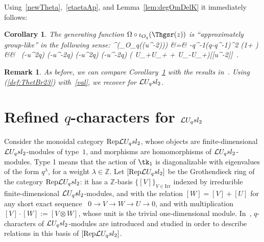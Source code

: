 \documentclass[11pt]{amsart}
\numberwithin{equation}{section}
\newtheorem{cor}[thm]{Corollary}
\newtheorem{rem}[thm]{Remark}
\numberwithin{equation}{section}
\begin{document}
Using~\eqref{newTheta},~\eqref{etaetaAp}, and Lemma~\ref{lem:degOmDelK} it immediately follows:
\begin{cor}\label{cor:DelTh} The generating function $\Omega \circ \iota_{O_q}(\Thgsr(z))$ is ``approximately group-like'' in the following sense: 
	\beqa
	\Delta^\Omega	\left(\Omega \circ\iota_{O_q}\left(\Thgsr(u^{-2})\right)\right) &=& -q^{-1}(q-q^{-1})^{2}   \left(1+  \right)   \nonumber\\
	&& \!\!\!\!\!\!\!\!  \times \ \Phig(-u^2q) \Psig(-u^{-2}q)  \otimes \Phig(-u^2q) \Psig(-u^{-2}q) \quad \mod  \left( U_+\otimes U_+ + U_-\otimes U_+\right)[[u^{-2}]]\ .\nonumber\label{Deltmodnc} 
	\eeqa
\end{cor}
\begin{rem} As before, we can compare Corollary~\ref{cor:DelTh}  with the results in~\cite{P24}. Using (\ref{def:ThetBr23}) with~\eqref{val}, we recover
 \cite[Thm.\,7.5 (2)]{P24} for $\mathcal{L} U_q sl_2$.
\end{rem} 



\section{Refined $q$-characters for $\mathcal{L} U_q sl_2$} \label{sec:refqchar}
Consider the monoidal  category $\mathrm{Rep}\mathcal{L} U_q sl_2$, whose objects are finite-dimensional $\mathcal{L} U_q sl_2$-modules  of type~$1$, and morphisms are homomorphisms of $\mathcal{L} U_q sl_2$-modules. Type 1 means that the action of $\tk_1$ is diagonalizable with eigenvalues of the form $q^{\lambda}$, for a weight $\lambda\in \mathbb{Z}$. 
 Let $[\mathrm{Rep}\mathcal{L} U_q sl_2]$ be the Grothendieck ring of the category $\mathrm{Rep}\mathcal{L} U_q sl_2$: it has a $\mathbb{Z}$-basis  $\{[V]\}_{V\in\mathrm{Irr}}$  indexed by irreducible finite-dimensional $\mathcal{L} U_q sl_2$-modules, and with the relation $[W] = [V] + [U]$ for any short exact sequence \ $0 \rightarrow V \rightarrow W \rightarrow U \rightarrow 0$, and with multiplication $[V]\cdot[W]:=[V\otimes W]$, whose unit is the trivial one-dimensional module.
 In~\cite{FR99,FMu99}, $q$-characters of $\mathcal{L} U_q sl_2$-modules are introduced and studied
  in order to describe relations  in this basis of $[\mathrm{Rep}\mathcal{L} U_q sl_2]$.
  
\end{document}
